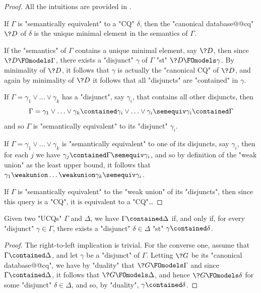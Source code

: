 \begin{proof}
	All the intuitions are provided in .
	
	 If $\Gamma$ is "semantically equivalent"
	to a "CQ" $\delta$, then the "canonical database@@cq" $\?D$ of $\delta$ is
	the unique minimal element in the semantics of $\Gamma$.

	 If the "semantics" of $\Gamma$
	contains a unique minimal element, say $\?D$, then since $\?D \FOmodels \Gamma$,
	there exists a "disjunct" $\gamma$ of $\Gamma$ "st" $\?D \FOmodels \gamma$.
	By minimality of $\?D$, it follows that $\gamma$ is actually the "canonical CQ" of $\?D$,
	and again by minimality of $\?D$ it follows that all "disjuncts" are "contained" in $\gamma$.

	 If $\Gamma = \gamma_1 \lor \dotsc \lor \gamma_k$
	has a "disjunct", say $\gamma_i$, that contains all other disjuncts, then
	\[
		\Gamma = \gamma_1 \lor \dotsc \lor \gamma_k \contained
		\gamma_i \lor \dotsc \lor \gamma_i \semequiv \gamma_i \contained \Gamma
	\]
	and so $\Gamma$ is "semantically equivalent" to its "disjunct" $\gamma_i$.

	 If $\Gamma = \gamma_1 \lor \dotsc \lor \gamma_k$ is "semantically equivalent" to
	one of its disjuncts, say $\gamma_i$, then
	for each $j$ we have $\gamma_j \contained \Gamma \semequiv \gamma_i$,
	and so by definition of the "weak union" as the least upper bound,
	it follows that $\gamma_1 \weakunion \dotsc \weakunion \gamma_k \semequiv \gamma_i$.

	 If $\Gamma$ is "semantically equivalent" to the
	"weak union" of its "disjuncts", then since this query is a "CQ", it
	is equivalent to a "CQ"…
\end{proof}

\begin{proposition}
	Given two "UCQs" $\Gamma$ and $\Delta$, we have $\Gamma \contained \Delta$
	if, and only if, for every "disjunct" $\gamma \in \Gamma$, there exists
	a "disjunct" $\delta \in \Delta$ "st" $\gamma \contained \delta$.
\end{proposition}

\begin{proof}
	The right-to-left implication is trivial.
	For the converse one, assume that $\Gamma \contained \Delta$,
	and let $\gamma$ be a "disjunct" of $\Gamma$.
	Letting $\?G$ be its "canonical database@@cq", we have by "duality" that
	$\?G \FOmodels \Gamma$
	and since $\Gamma \contained \Delta$, it follows that $\?G \FOmodels \Delta$,
	and hence $\?G \FOmodels \delta$ for some "disjunct" $\delta \in \Delta$,
	and so, by "duality", $\gamma \contained \delta$. 
\end{proof}

